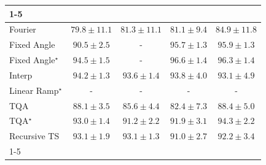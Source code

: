 \begin{tabular}{l|cccc|}
\cline{1-5}
\multicolumn{5}{c}{\rule{0pt}{8pt}SV} \\
\midrule
Fourier & {\cellcolor[HTML]{88B1D4}} \color[HTML]{000000} $79.8\pm 11.1$ & {\cellcolor[HTML]{75A9CF}} \color[HTML]{F1F1F1} $81.3\pm 11.1$ & {\cellcolor[HTML]{76AAD0}} \color[HTML]{F1F1F1} $81.1\pm 9.4$ & {\cellcolor[HTML]{3D93C2}} \color[HTML]{F1F1F1} $84.9\pm 11.8$ \\
Fixed Angle & {\cellcolor[HTML]{0569A4}} \color[HTML]{F1F1F1} $90.5\pm 2.5$ & {\cellcolor[HTML]{000000}} \color[HTML]{F1F1F1} {\cellcolor{white}} \color{black} - & {\cellcolor[HTML]{03456C}} \color[HTML]{F1F1F1} $95.7\pm 1.3$ & {\cellcolor[HTML]{034369}} \color[HTML]{F1F1F1} $95.9\pm 1.3$ \\
Fixed Angle$^\star$ & {\cellcolor[HTML]{034E7B}} \color[HTML]{F1F1F1} $94.5\pm 1.5$ & {\cellcolor[HTML]{000000}} \color[HTML]{F1F1F1} {\cellcolor{white}} \color{black} - & {\cellcolor[HTML]{023C5F}} \color[HTML]{F1F1F1} $96.6\pm 1.4$ & {\cellcolor[HTML]{023F64}} \color[HTML]{F1F1F1} $96.3\pm 1.4$ \\
Interp & {\cellcolor[HTML]{045280}} \color[HTML]{F1F1F1} $94.2\pm 1.3$ & {\cellcolor[HTML]{045687}} \color[HTML]{F1F1F1} $93.6\pm 1.4$ & {\cellcolor[HTML]{045585}} \color[HTML]{F1F1F1} $93.8\pm 4.0$ & {\cellcolor[HTML]{045B8E}} \color[HTML]{F1F1F1} $93.1\pm 4.9$ \\
Linear Ramp$^\star$ & {\cellcolor[HTML]{000000}} \color[HTML]{F1F1F1} {\cellcolor{white}} \color{black} - & {\cellcolor[HTML]{000000}} \color[HTML]{F1F1F1} {\cellcolor{white}} \color{black} - & {\cellcolor[HTML]{000000}} \color[HTML]{F1F1F1} {\cellcolor{white}} \color{black} - & {\cellcolor[HTML]{000000}} \color[HTML]{F1F1F1} {\cellcolor{white}} \color{black} - \\
TQA & {\cellcolor[HTML]{1379B5}} \color[HTML]{F1F1F1} $88.1\pm 3.5$ & {\cellcolor[HTML]{328DBF}} \color[HTML]{F1F1F1} $85.6\pm 4.4$ & {\cellcolor[HTML]{63A2CB}} \color[HTML]{F1F1F1} $82.4\pm 7.3$ & {\cellcolor[HTML]{0F76B3}} \color[HTML]{F1F1F1} $88.4\pm 5.0$ \\
TQA$^\star$ & {\cellcolor[HTML]{045B8E}} \color[HTML]{F1F1F1} $93.0\pm 1.4$ & {\cellcolor[HTML]{05659F}} \color[HTML]{F1F1F1} $91.2\pm 2.2$ & {\cellcolor[HTML]{046198}} \color[HTML]{F1F1F1} $91.9\pm 3.1$ & {\cellcolor[HTML]{03517E}} \color[HTML]{F1F1F1} $94.3\pm 2.2$ \\
Recursive TS & {\cellcolor[HTML]{045B8E}} \color[HTML]{F1F1F1} $93.1\pm 1.9$ & {\cellcolor[HTML]{045B8E}} \color[HTML]{F1F1F1} $93.1\pm 1.3$ & {\cellcolor[HTML]{0566A0}} \color[HTML]{F1F1F1} $91.0\pm 2.7$ & {\cellcolor[HTML]{046096}} \color[HTML]{F1F1F1} $92.2\pm 3.4$ \\
\cline{1-5}
\bottomrule
\end{tabular}
